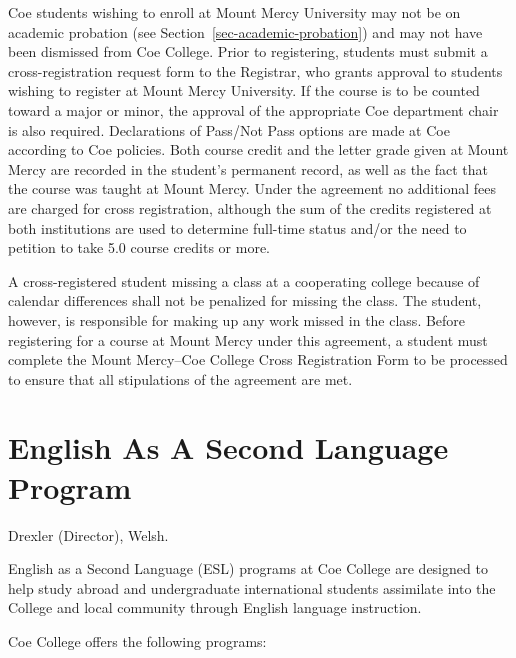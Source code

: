 \documentclass[
  letterpaper,
]{scrbook}
\begin{document}
Coe students wishing to enroll at Mount Mercy University may not be on
academic probation (see Section~\ref{sec-academic-probation}) and may
not have been dismissed from Coe College. Prior to registering, students
must submit a cross-registration request form to the Registrar, who
grants approval to students wishing to register at Mount Mercy
University. If the course is to be counted toward a major or minor, the
approval of the appropriate Coe department chair is also required.
Declarations of Pass/Not Pass options are made at Coe according to Coe
policies. Both course credit and the letter grade given at Mount Mercy
are recorded in the student's permanent record, as well as the fact that
the course was taught at Mount Mercy. Under the agreement no additional
fees are charged for cross registration, although the sum of the credits
registered at both institutions are used to determine full-time status
and/or the need to petition to take 5.0 course credits or more.

A cross-registered student missing a class at a cooperating college
because of calendar differences shall not be penalized for missing the
class. The student, however, is responsible for making up any work
missed in the class. Before registering for a course at Mount Mercy
under this agreement, a student must complete the Mount Mercy--Coe
College Cross Registration Form to be processed to ensure that all
stipulations of the agreement are met.

\section{English As A Second Language
Program}\label{english-as-a-second-language-program}

Drexler (Director), Welsh.

English as a Second Language (ESL) programs at Coe College are designed
to help study abroad and undergraduate international students assimilate
into the College and local community through English language
instruction.

Coe College offers the following programs:
\end{document}
